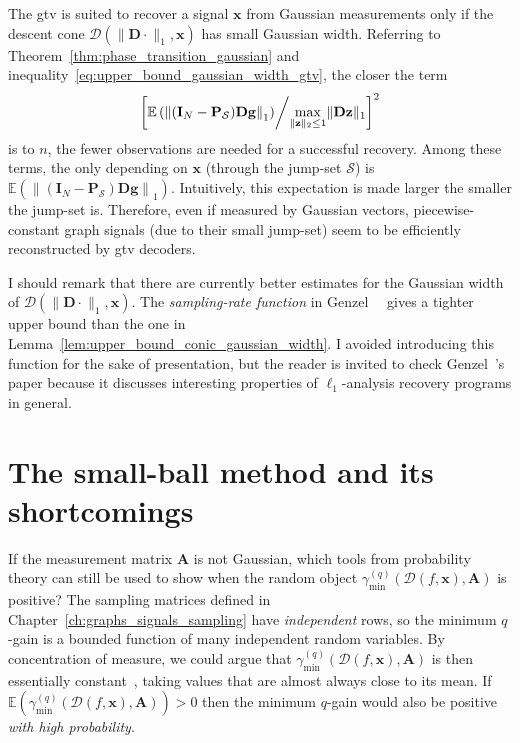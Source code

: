 The \acrshort{gtv} is suited to recover a signal $\mathbf{x}$ from Gaussian measurements only if the descent cone $\mathcal{D}(\|\mathbf{D} \cdot \|_1, \mathbf{x})$ has small Gaussian width. Referring to Theorem~\ref{thm:phase_transition_gaussian} and inequality~\eqref{eq:upper_bound_gaussian_width_gtv}, the closer the term $$\left[ \mathbb{E} \left ( \left \|(\mathbf{I}_N - \mathbf{P}_\mathcal{S}) \mathbf{Dg} \right \|_1 \right ) \middle/ \underset{\|\mathbf{z}\|_2 \leq 1}{\max} \| \mathbf{Dz} \|_1 \right ]^2$$ is to $n$, the fewer observations are needed for a successful recovery. Among these terms, the only depending on $\mathbf{x}$ (through the jump-set $\mathcal{S}$) is $\mathbb{E} \left ( \left \|(\mathbf{I}_N - \mathbf{P}_\mathcal{S}) \mathbf{Dg} \right \|_1\right)$. Intuitively, this expectation is made larger the smaller the jump-set is. Therefore, even if measured by Gaussian vectors, piecewise-constant graph signals (due to their small jump-set) seem to be efficiently reconstructed by \acrshort{gtv} decoders.

I should remark that there are currently better estimates for the Gaussian width of $\mathcal{D}(\|\mathbf{D} \cdot \|_1, \mathbf{x})$. The \emph{sampling-rate function} in Genzel~\etal~\cite{genzel2017a} gives a tighter upper bound than the one in Lemma~\ref{lem:upper_bound_conic_gaussian_width}. I avoided introducing this function for the sake of presentation, but the reader is invited to check Genzel~\etal's paper because it discusses interesting properties of $\ell_1$-analysis recovery programs in general.


\section{The small-ball method and its shortcomings}

If the measurement matrix $\mathbf{A}$ is not Gaussian, which tools from probability theory can still be used to show when the random object $\gamma_{\min}^{(q)} \left ( \mathcal{D}( f, \mathbf{x}), \mathbf{A} \right )$ is positive? The sampling matrices defined in Chapter~\ref{ch:graphs_signals_sampling} have \emph{independent} rows, so the minimum $q$-gain is a bounded function of many independent random variables. By concentration of measure, we could argue that $\gamma_{\min}^{(q)} \left ( \mathcal{D}( f, \mathbf{x}), \mathbf{A} \right )$ is then essentially constant~\cite{talagrand1996}, taking values that are almost always close to its mean. If $\mathbb{E} \left ( \gamma_{\min}^{(q)} \left ( \mathcal{D}( f, \mathbf{x}), \mathbf{A} \right ) \right ) > 0$ then the minimum $q$-gain would also be positive \emph{with high probability}.

